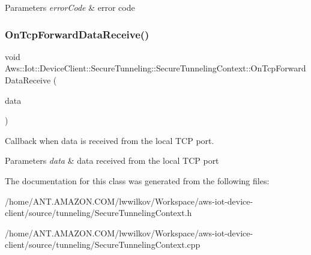 \begin{DoxyParams}{Parameters}
{\em error\+Code} & error code \\
\hline
\end{DoxyParams}
\mbox{\label{class_aws_1_1_iot_1_1_device_client_1_1_secure_tunneling_1_1_secure_tunneling_context_a72d579a67fd19f1462a15cee8033de73}} 
\subsubsection{\texorpdfstring{On\+Tcp\+Forward\+Data\+Receive()}{OnTcpForwardDataReceive()}}
{\footnotesize\ttfamily void Aws\+::\+Iot\+::\+Device\+Client\+::\+Secure\+Tunneling\+::\+Secure\+Tunneling\+Context\+::\+On\+Tcp\+Forward\+Data\+Receive (\begin{DoxyParamCaption}\item[{const Crt\+::\+Byte\+Buf \&}]{data }\end{DoxyParamCaption})\hspace{0.3cm}{\ttfamily [private]}}



Callback when data is received from the local T\+CP port. 


\begin{DoxyParams}{Parameters}
{\em data} & data received from the local T\+CP port \\
\hline
\end{DoxyParams}


The documentation for this class was generated from the following files\+:\begin{DoxyCompactItemize}
\item 
/home/\+A\+N\+T.\+A\+M\+A\+Z\+O\+N.\+C\+O\+M/lwwilkov/\+Workspace/aws-\/iot-\/device-\/client/source/tunneling/Secure\+Tunneling\+Context.\+h\item 
/home/\+A\+N\+T.\+A\+M\+A\+Z\+O\+N.\+C\+O\+M/lwwilkov/\+Workspace/aws-\/iot-\/device-\/client/source/tunneling/Secure\+Tunneling\+Context.\+cpp\end{DoxyCompactItemize}
